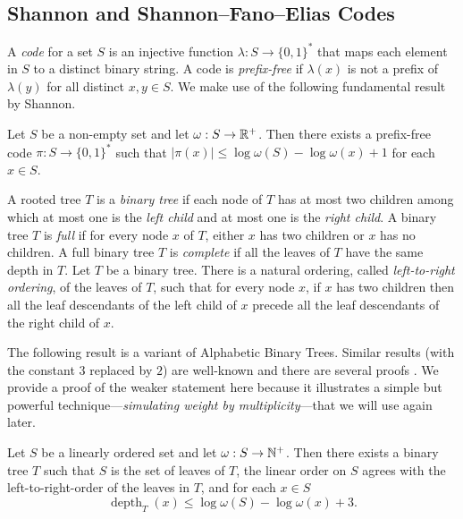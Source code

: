 \documentclass{patmorin}
\DeclareMathOperator{\depth}{depth}
\renewcommand{\le}{\leqslant}
\newcommand{\defin}[1]{\emph{\textcolor{brightmaroon}{#1}}}
\begin{document}
  \subsection{Shannon and Shannon--Fano--Elias Codes}

  A \defin{code} for a set $S$ is an injective function $\lambda:S\to\{0,1\}^*$ that maps each element in $S$ to a distinct binary string.  A code is \defin{prefix-free} if $\lambda(x)$ is not a prefix of $\lambda(y)$ for all distinct $x,y\in S$.
  We make use of the following fundamental result by Shannon.
  \begin{lem}\label{shannon_code}
    Let $S$ be a non-empty set and let $\omega:S\to\mathbb{R}^+$.  Then there exists a prefix-free code $\pi:S\to\{0,1\}^*$ such that $|\pi(x)|\le \log\omega(S)-\log\omega(x)+1$ for each $x\in S$.
  \end{lem}

  A rooted tree $T$ is a \defin{binary tree} if each node of $T$ has at most two children among which at most one is the \defin{left child} and at most one is the \defin{right child}.
  A binary tree $T$ is \defin{full} if for every node $x$ of $T$,
  either $x$ has two children or $x$ has no children.
  A full binary tree $T$ is \defin{complete} if all the leaves of $T$ have the same depth in $T$.
  Let $T$ be a binary tree. There is a natural ordering, called \defin{left-to-right ordering}, of the leaves of $T$, such that for every node $x$, if $x$ has two children then all the leaf descendants of the left child of $x$ precede all the leaf descendants of the right child of $x$.


  The following result is a variant of Alphabetic Binary Trees. Similar results (with the constant $3$ replaced by $2$) are well-known and there are several proofs \cite{knuth:art_iii,mehlhorn:nearly,gilbert.moore:variable_length}. We provide a proof of the weaker statement here because it illustrates a simple but powerful technique---\defin{simulating weight by multiplicity}---that we will use again later.


    \begin{lem}\label{shannon_fano_elias_tree}\label{shannon_fano_elias}
    Let $S$ be a linearly ordered set and let $\omega:S\to\mathbb{N}^+$. Then there exists a binary tree $T$ such that $S$ is the set of leaves of $T$,
    the linear order on $S$ agrees with the left-to-right-order of the leaves in $T$, and for each $x\in S$
    \[
    \depth_{T}(x)\le \log\omega(S) - \log\omega(x) + 3.
    \]
  \end{lem}
\end{document}
